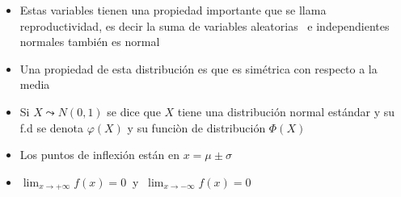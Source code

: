 \begin{itemize}
\item Estas variables tienen una propiedad importante que se llama
reproductividad, es decir la suma de variables aleatorias \ e independientes
normales tambi\'{e}n es normal

\item Una propiedad de esta distribuci\'{o}n es que es sim\'{e}trica con
respecto a la media

\item Si $X\leadsto N\left(  0,1\right)  $ se dice que $X$ tiene una
distribuci\'{o}n normal est\'{a}ndar y su f.d se denota $\varphi\left(
X\right)  $ y su funci\`{o}n de distribuci\'{o}n $\Phi\left(  X\right)  $

\item Los puntos de inflexi\'{o}n est\'{a}n en $x=\mu\pm\sigma$

\item $\lim_{x\longrightarrow+\infty}f\left(  x\right)  =0\;\;$y$\;\;\lim
_{x\longrightarrow-\infty}f\left(  x\right)  =0$
\end{itemize}